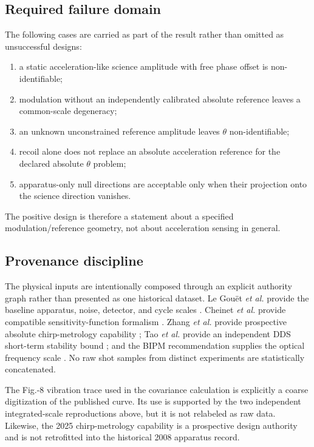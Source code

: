 \subsection{Required failure domain}

The following cases are carried as part of the result rather than omitted as unsuccessful designs:
\begin{enumerate}
\item a static acceleration-like science amplitude with free phase offset is non-identifiable;
\item modulation without an independently calibrated absolute reference leaves a common-scale degeneracy;
\item an unknown unconstrained reference amplitude leaves $\theta$ non-identifiable;
\item recoil alone does not replace an absolute acceleration reference for the declared absolute $\theta$ problem;
\item apparatus-only null directions are acceptable only when their projection onto the science direction vanishes.
\end{enumerate}
The positive design is therefore a statement about a specified modulation/reference geometry, not about acceleration sensing in general.

\subsection{Provenance discipline}

The physical inputs are intentionally composed through an explicit authority graph rather than presented as one historical dataset. Le Gou\"et \emph{et al.} provide the baseline apparatus, noise, detector, and cycle scales \cite{LeGouet2008}. Cheinet \emph{et al.} provide compatible sensitivity-function formalism \cite{Cheinet2008}. Zhang \emph{et al.} provide prospective absolute chirp-metrology capability \cite{Zhang2025}; Tao \emph{et al.} provide an independent DDS short-term stability bound \cite{Tao2015}; and the BIPM recommendation supplies the optical frequency scale \cite{BIPM2015}. No raw shot samples from distinct experiments are statistically concatenated.

The Fig.-8 vibration trace used in the covariance calculation is explicitly a coarse digitization of the published curve. Its use is supported by the two independent integrated-scale reproductions above, but it is not relabeled as raw data. Likewise, the 2025 chirp-metrology capability is a prospective design authority and is not retrofitted into the historical 2008 apparatus record.

